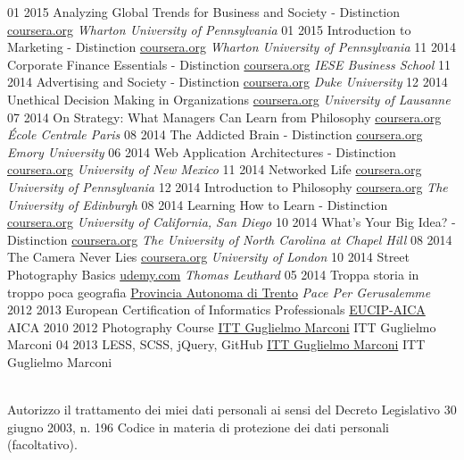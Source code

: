 \documentclass[]{friggeri-cv}
\begin{document}
\begin{entrylist}
\entry
    {01 2015}
    {Analyzing Global Trends for Business and Society - Distinction}
    {\href{http://mickfenneck.github.io/certificates/analyzingglobaltrends.pdf}{coursera.org}}
    {\emph{Wharton University of Pennsylvania}}
\entry
    {01 2015}
    {Introduction to Marketing - Distinction}
    {\href{http://mickfenneck.github.io/certificates/intromarketing.pdf}{coursera.org}}
    {\emph{Wharton University of Pennsylvania}}  
\entry
    {11 2014}
    {Corporate Finance Essentials - Distinction}
    {\href{http://mickfenneck.github.io/certificates/corporatefinance.pdf}{coursera.org}}
    {\emph{IESE Business School}}
\entry
    {11 2014}
    {Advertising and Society - Distinction}
    {\href{http://mickfenneck.github.io/certificates/advertsoc.pdf}{coursera.org}}
    {\emph{Duke University}}
\entry
    {12 2014}
    {Unethical Decision Making in Organizations}
    {\href{http://mickfenneck.github.io/certificates/unethicaldecisionmaking.pdf}{coursera.org}}
    {\emph{University of Lausanne}}
\entry
    {07 2014}
    {On Strategy: What Managers Can Learn from Philosophy}
    {\href{http://mickfenneck.github.io/certificates/managerphilo.pdf}{coursera.org}}
    {\emph{École Centrale Paris}}
\entry
    {08 2014}
    {The Addicted Brain - Distinction}
    {\href{http://mickfenneck.github.io/certificates/addictedbrain.pdf}{coursera.org}}
    {\emph{Emory University}}
\entry
    {06 2014}
    {Web Application Architectures - Distinction}
    {\href{http://mickfenneck.github.io/certificates/webarch.pdf}{coursera.org}}
    {\emph{University of New Mexico}}
\entry
    {11 2014}
    {Networked Life}
    {\href{http://mickfenneck.github.io/certificates/networkedlife.pdf}{coursera.org}}
    {\emph{University of Pennsylvania}}
\entry
    {12 2014}
    {Introduction to Philosophy}
    {\href{http://mickfenneck.github.io/certificates/introphilo.pdf}{coursera.org}}
    {\emph{The University of Edinburgh}}
\entry
    {08 2014}
    {Learning How to Learn - Distinction}
    {\href{http://coursera.org}{coursera.org}}
    {\emph{University of California, San Diego}}
\entry
    {10 2014}
    {What's Your Big Idea? - Distinction}
    {\href{http://coursera.org}{coursera.org}}
    {\emph{The University of North Carolina at Chapel Hill}}
\entry
    {08 2014}
    {The Camera Never Lies}
    {\href{http://coursera.org}{coursera.org}}
    {\emph{University of London}}
\entry
    {10 2014}
    {Street Photography Basics}
    {\href{https://www.udemy.com}{udemy.com}}
    {\emph{Thomas Leuthard}}
 \entry
    {05 2014}
    {Troppa storia in troppo poca geografia}
    {\href{http://www.provincia.tn.it}{Provincia Autonoma di Trento}}
    {\emph{Pace Per Gerusalemme}}
\entry
    {2012 2013}
    {European Certification of Informatics Professionals}
    {\href{http://www.eucip.it}{EUCIP-AICA}}
    {AICA}
\entry
    {2010 2012}
    {Photography Course}
    {\href{http://marconirovereto.it}{ITT Guglielmo Marconi}}
    {ITT Guglielmo Marconi}
\entry
    {04 2013}
    {LESS, SCSS, jQuery, GitHub}
    {\href{http://marconirovereto.it}{ITT Guglielmo Marconi}}
    {ITT Guglielmo Marconi}
\end{entrylist}
\\
Autorizzo il trattamento dei miei dati personali ai sensi del Decreto Legislativo 30 giugno 2003, n. 196 Codice in materia di protezione dei dati personali (facoltativo).
\end{document}
